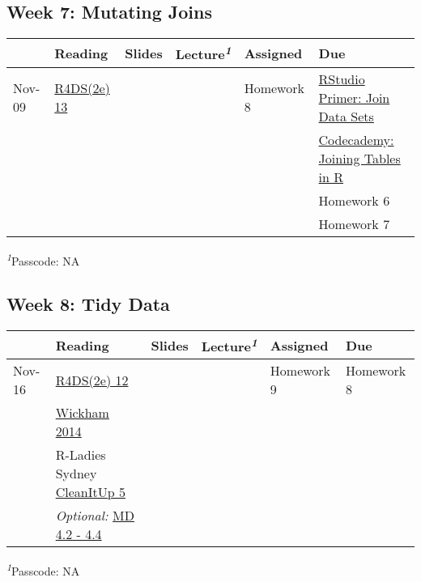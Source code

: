 \documentclass[
  letterpaper,
  DIV=11,
  numbers=noendperiod]{scrartcl}
\begin{document}
\hypertarget{week-7-mutating-joins}{%
\subsection{Week 7: Mutating Joins}\label{week-7-mutating-joins}}

\setlength{\LTpost}{0mm}
\begin{longtable*}{llllll}
\toprule
 & Reading & Slides & Lecture\textsuperscript{\textit{1}} & Assigned & Due \\ 
\midrule\addlinespace[2.5pt]
Nov-09 & \href{https://r4ds.had.co.nz/relational-data.html}{R4DS(2e) 13} &  &  & Homework 8 & \href{https://posit.cloud/learn/primers/4.3}{RStudio Primer: Join Data Sets} \\ 
 &  &  &  &  & \href{https://www.codecademy.com/courses/learn-r/lessons/r-multiple-tables/exercises/introduction}{Codecademy: Joining Tables in R} \\ 
 &  &  &  &  & Homework 6 \\ 
 &  &  &  &  & Homework 7 \\ 
\bottomrule
\end{longtable*}
\begin{minipage}{\linewidth}
\textsuperscript{\textit{1}}Passcode: NA\\
\end{minipage}

\hypertarget{week-8-tidy-data}{%
\subsection{Week 8: Tidy Data}\label{week-8-tidy-data}}

\setlength{\LTpost}{0mm}
\begin{longtable*}{llllll}
\toprule
 & Reading & Slides & Lecture\textsuperscript{\textit{1}} & Assigned & Due \\ 
\midrule\addlinespace[2.5pt]
Nov-16 & \href{https://r4ds.had.co.nz/tidy-data.html}{R4DS(2e) 12} &  &  & Homework 9 & Homework 8 \\ 
 & \href{http://www.jstatsoft.org/v59/i10/paper}{Wickham 2014} &  &  &  &  \\ 
 & R-Ladies Sydney \href{https://rladiessydney.org/courses/ryouwithme/02-cleanitup-5/}{CleanItUp 5} &  &  &  &  \\ 
 & \emph{Optional:} \href{https://moderndive.com/4-tidy.html\#tidy-data-ex}{MD 4.2 - 4.4} &  &  &  &  \\ 
\bottomrule
\end{longtable*}
\begin{minipage}{\linewidth}
\textsuperscript{\textit{1}}Passcode: NA\\
\end{minipage}
\end{document}
